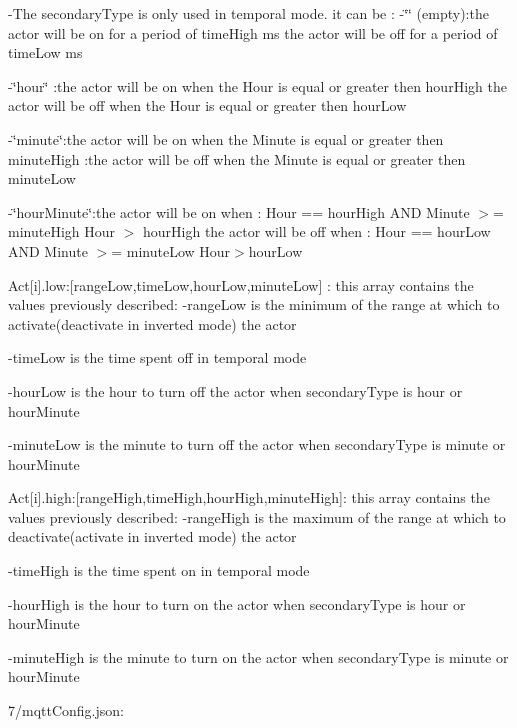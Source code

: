 -\/\+The secondary\+Type is only used in temporal mode. it can be \+: -\/\char`\"{}\char`\"{} (empty)\+:the actor will be on for a period of time\+High ms the actor will be off for a period of time\+Low ms

-\/\char`\"{}hour\char`\"{} \+:the actor will be on when the Hour is equal or greater then hour\+High the actor will be off when the Hour is equal or greater then hour\+Low

-\/\char`\"{}minute\char`\"{}\+:the actor will be on when the Minute is equal or greater then minute\+High \+:the actor will be off when the Minute is equal or greater then minute\+Low

-\/\char`\"{}hour\+Minute\char`\"{}\+:the actor will be on when \+: Hour == hour\+High A\+ND Minute $>$= minute\+High Hour $>$ hour\+High the actor will be off when \+: Hour == hour\+Low A\+ND Minute $>$= minute\+Low Hour$>$hour\+Low

Act\mbox{[}i\mbox{]}.low\+:\mbox{[}range\+Low,time\+Low,hour\+Low,minute\+Low\mbox{]} \+: this array contains the values previously described\+: -\/range\+Low is the minimum of the range at which to activate(deactivate in inverted mode) the actor

-\/time\+Low is the time spent off in temporal mode

-\/hour\+Low is the hour to turn off the actor when secondary\+Type is hour or hour\+Minute

-\/minute\+Low is the minute to turn off the actor when secondary\+Type is minute or hour\+Minute

\begin{DoxyVerb}Act[i].high:[rangeHigh,timeHigh,hourHigh,minuteHigh]: this array contains the values previously described:
                                                  -rangeHigh is the maximum of the range at which 
                                                  to deactivate(activate in inverted mode) the actor

                                                  -timeHigh is the time spent on in temporal mode

                                                  -hourHigh is the hour to turn on the actor when secondaryType is hour or hourMinute

                                                  -minuteHigh is the minute to turn on the actor when secondaryType is minute or hourMinute
\end{DoxyVerb}


7/mqtt\+Config.\+json\+:

